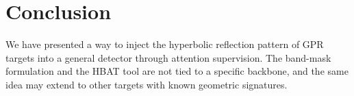 \documentclass[lettersize,journal]{IEEEtran}
\begin{document}


\section{Conclusion}

We have presented a way to inject the hyperbolic reflection pattern of GPR targets into a general detector through attention supervision. The band-mask formulation and the HBAT tool are not tied to a specific backbone, and the same idea may extend to other targets with known geometric signatures.
\end{document}
